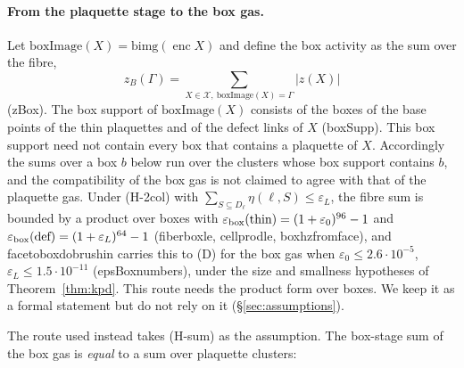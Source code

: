 \documentclass[11pt,a4paper]{article}
\theoremstyle{definition}
\theoremstyle{remark}
\DeclareRobustCommand{\lean}[1]{{\ttfamily\renewcommand{\_}{\textunderscore\allowbreak}#1}}
\newcommand{\enc}{\operatorname{enc}}
\begin{document}
\paragraph{From the plaquette stage to the box gas.} Let $\mathrm{boxImage}(X)=\mathrm{bimg}(\enc X)$ and define the box activity as the sum over the fibre,
\[
z_B(\Gamma)=\sum_{X\in\mathcal X,\ \mathrm{boxImage}(X)=\Gamma}|z(X)|
\]
(\lean{zBox}). The box support of $\mathrm{boxImage}(X)$ consists of the boxes of the base points of the thin plaquettes and of the defect links of $X$ (\lean{boxSupp}). This box support need not contain every box that contains a plaquette of $X$. Accordingly the sums over a box $b$ below run over the clusters whose box support contains $b$, and the compatibility of the box gas is not claimed to agree with that of the plaquette gas. Under (H-2col) with $\sum_{S\subseteq D_\ell}\eta(\ell,S)\le\varepsilon_L$, the fibre sum is bounded by a product over boxes with $\varepsilon_{\rm box}(\text{thin})=(1+\varepsilon_0)^{96}-1$ and $\varepsilon_{\rm box}(\text{def})=(1+\varepsilon_L)^{64}-1$ (\lean{fiber\_box\_le}, \lean{cell\_prod\_le}, \lean{box\_hz\_from\_face}), and \lean{face\_to\_box\_dobrushin} carries this to (D) for the box gas when $\varepsilon_0\le2.6\cdot10^{-5}$, $\varepsilon_L\le1.5\cdot10^{-11}$ (\lean{epsBox\_numbers}), under the size and smallness hypotheses of Theorem~\ref{thm:kpd}. This route needs the product form over boxes. We keep it as a formal statement but do not rely on it (\S\ref{sec:assumptions}).

The route used instead takes (H-sum) as the assumption. The box-stage sum of the box gas is \emph{equal} to a sum over plaquette clusters:
\end{document}
